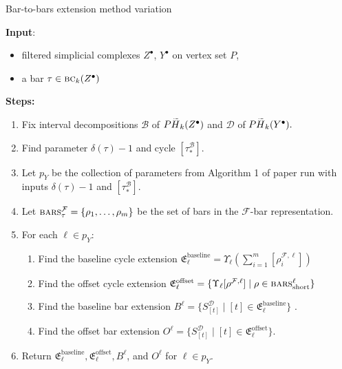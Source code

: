 \documentclass{article}
\newcommand{\bc}{\text{\sc bc}}
\newcommand{\HH}{\smash{\widetilde{H}}}
\begin{document}
\begin{algorithm}[H]
\caption{Bar-to-bars extension method variation}
\label{alg_variation}
\textbf{Input}:
\begin{itemize}
    \item filtered simplicial complexes $Z^{\bullet}$, $Y^{\bullet}$ on vertex set $P$, 
    \item a bar $\tau \in \bc_k(Z^{\bullet})$
    \end{itemize}

\textbf{Steps:}
\begin{enumerate}
\item Fix interval decompositions $\mathcal{B}$ of $P\HH_k(Z^{\bullet})$ and $\mathcal{D}$ of $P\HH_k(Y^{\bullet}).$
\item Find parameter $\delta(\tau)-1$ and cycle $[\tau_*^{\mathcal{B}}]$.
\item Let $p_Y$ be the collection of parameters from Algorithm 1 of paper run with inputs $\delta(\tau)-1$ and $[\tau_*^{\mathcal{B}}]$. 
\item Let $\text{\sc{bars}}_{\tau}^{\mathcal{F}} = \{ \rho_1, \dots, \rho_m \}$ be the set of bars in the $\mathcal{F}$-bar representation.
\item For each $\ell \in p_Y$:
	\begin{enumerate}
	\item Find the baseline cycle extension $\mathfrak{E}_{\ell}^{\text{baseline}} = \Upsilon_{\ell}(\sum_{i=1}^m [\rho_i^{\mathcal{F}, \ell}])$
	\item Find the offset cycle extension $\mathfrak{E}_{\ell}^{\text{offset}} = \{ \Upsilon_{\ell}[\rho^{\mathcal{F}, \ell}] \; | \; \rho \in \text{\sc{bars}}_{\text{short}}^{\ell}\} $
	\item Find the baseline bar extension  $B^{\ell} = \{ S^{\mathcal{D}}_{[t]} \; | \; [t] \in \mathfrak{E}_{\ell}^{\text{baseline}} \}$ .
	\item Find the offset bar extension $O^{\ell} = \{ S^{\mathcal{D}}_{[t]} \; | \; [t] \in \mathfrak{E}_{\ell}^{\text{offset}} \}$.
	\end{enumerate}

\item Return $\mathfrak{E}_{\ell}^{\text{baseline}}, \mathfrak{E}_{\ell}^{\text{offset}}, B^{\ell}$, and $O^{\ell}$ for $\ell \in p_Y$.
\end{enumerate}
\end{algorithm}
\end{document}

